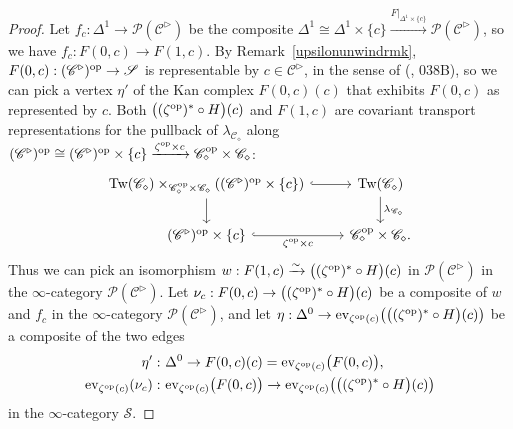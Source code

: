 \documentclass{tac}
\newcommand{\s}[1]{\mathscr{#1}}
\newcommand{\tx}[1]{\textnormal{#1}}
\begin{document}
\begin{proof}
\hfill

Let $f_c : \Delta^1 \to \s{P}(\s{C}^\triangleright )$ be the composite $\Delta^1 \cong \Delta^1 \times \{c\} \xrightarrow{F|_{\Delta^1 \times \{c\}}} \s{P}(\s{C}^\triangleright ) $, so we have $f_c : F(0,c) \to F(1,c)$.  By Remark~\ref{upsilonunwindrmk}, $F(0,c) : (\s{C}^\triangleright )^\tx{op} \to \s{S}$ is representable by $c \in \s{C}^\triangleright $, in the sense of (\cite{kerodon}, 038B), so we can pick a vertex $\eta'$ of the Kan complex $F(0,c)(c)$ that exhibits $F(0,c)$ as represented by $c$.  Both $\big( (\zeta^\tx{op})^* \circ H \big) (c)$ and $F(1,c)$ are covariant transport representations for the pullback of $\lambda_{\s{C}_\diamond }$ along $(\s{C}^\triangleright )^\tx{op} \cong (\s{C}^\triangleright )^\tx{op} \times \{ c\} \xrightarrow{\zeta^\tx{op} \times c} \s{C}_\diamond^\tx{op} \times \s{C}_\diamond$:
\[\begin{tikzcd}
 \tx{Tw}(\s{C}_\diamond) \times_{ \s{C}_\diamond^\tx{op} \times \s{C}_\diamond} (  (\s{C}^\triangleright )^\tx{op} \times \{ c\} ) \arrow[hook]{r} \arrow[]{d} &  \tx{Tw}(\s{C}_\diamond) \arrow[]{d}{\lambda_{\s{C}_\diamond}} \\
 (\s{C}^\triangleright )^\tx{op} \times \{ c\} \arrow[hook]{r}[swap]{\zeta^\tx{op} \times c }  & \s{C}_\diamond^\tx{op} \times \s{C}_\diamond .
\end{tikzcd}\]
Thus we can pick an isomorphism $w : F(1,c) \xrightarrow{\sim} \big( (\zeta^\tx{op})^* \circ H \big) (c)$ in $\s{P} (\s{C}^\triangleright )$ in the $\infty$-category $\s{P}(\s{C}^\triangleright )$.  Let $\nu_c : F(0,c) \to  \big( (\zeta^\tx{op})^* \circ H \big) (c)$ be a composite of $w$ and $f_c$ in the $\infty$-category $\s{P}(\s{C}^\triangleright )$, and let $\eta : \Delta^0 \to \tx{ev}_{\zeta^\tx{op} (c)} \big( \big( (\zeta^\tx{op})^* \circ H \big) (c) \big)$ be a composite of the two edges 
\begin{align*} \eta' : & \tx{ } \Delta^0  \rightarrow F(0,c)(c)=  \tx{ev}_{\zeta^\tx{op} (c)} \big( F(0,c) \big) , \\
\tx{ev}_{\zeta^\tx{op} (c)} (\nu_c ) : & \tx{ } \tx{ev}_{\zeta^\tx{op} (c)} \big( F(0,c) \big) \to \tx{ev}_{\zeta^\tx{op} (c)} \big( \big( (\zeta^\tx{op})^* \circ H \big) (c) \big) \end{align*}
in the $\infty$-category $\s{S}$.


\end{proof}
\end{document}
